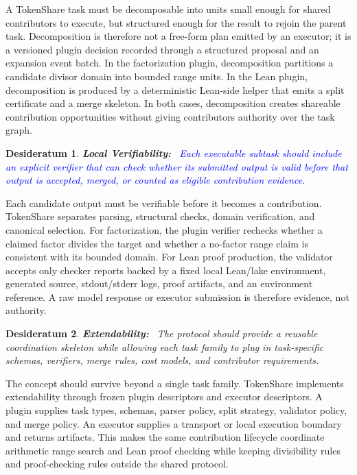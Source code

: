 \documentclass{article}
\theoremstyle{plain}
\newtheorem{desideratum}{Desideratum}
\begin{document}
{\color{blue}
A TokenShare task must be decomposable into units small enough for shared contributors to execute, but structured enough for the result to rejoin the parent task. Decomposition is therefore not a free-form plan emitted by an executor; it is a versioned plugin decision recorded through a structured proposal and an expansion event batch. In the factorization plugin, decomposition partitions a candidate divisor domain into bounded range units. In the Lean plugin, decomposition is produced by a deterministic Lean-side helper that emits a split certificate and a merge skeleton. In both cases, decomposition creates shareable contribution opportunities without giving contributors authority over the task graph.
}


\begin{desideratum}
\textbf{Local Verifiability:}~ \textcolor{blue}{Each executable subtask should include an explicit verifier that can check whether its submitted output is valid before that output is accepted, merged, or counted as eligible contribution evidence.}
\end{desideratum}

{\color{blue}
Each candidate output must be verifiable before it becomes a contribution. TokenShare separates parsing, structural checks, domain verification, and canonical selection. For factorization, the plugin verifier rechecks whether a claimed factor divides the target and whether a no-factor range claim is consistent with its bounded domain. For Lean proof production, the validator accepts only checker reports backed by a fixed local Lean/lake environment, generated source, stdout/stderr logs, proof artifacts, and an environment reference. A raw model response or executor submission is therefore evidence, not authority.
}


\begin{desideratum}
\textbf{Extendability:}~ The protocol should provide a reusable coordination skeleton while allowing each task family to plug in task-specific schemas, verifiers, merge rules, cost models, and contributor requirements.
\end{desideratum}

{\color{blue}
The concept should survive beyond a single task family. TokenShare implements extendability through frozen plugin descriptors and executor descriptors. A plugin supplies task types, schemas, parser policy, split strategy, validator policy, and merge policy. An executor supplies a transport or local execution boundary and returns artifacts. This makes the same contribution lifecycle coordinate arithmetic range search and Lean proof checking while keeping divisibility rules and proof-checking rules outside the shared protocol.
}
\end{document}
